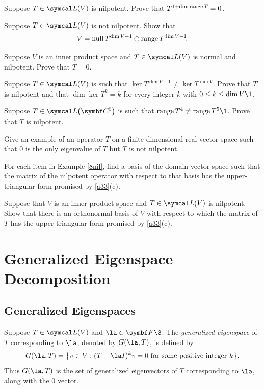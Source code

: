 \begin{exercises}
\exercise
Suppose $T \in \L(V)$ is nilpotent. Prove that $T^{1 + \dim \operatorname{range} T} = 0$.\label{nilrange}


\exercise
Suppose $T\in \L(V)$ is not nilpotent. Show that\label{8notnil}
\[
V = \operatorname{null} T^{\dim V-1} \oplus \operatorname{range} T^{\dim V-1}\!.
\]
\exercisedisplayend
{}


\exercise
Suppose $V$ is an inner product space and $T \in \L(V)$ is normal and nilpotent. Prove that $T = 0$.


\exercise
Suppose $T \in \L(V)$ is such that $\ker T^{\dim V - 1} \ne \ker T^{\dim V}\!$.  Prove that $T$ is nilpotent and that
$
\dim \ker T^k = k$
for every integer $k$ with $0 \le k \le \dim V\1$.\label{8nullTk}


\exercise
Suppose $T \in \L\paren[\big]{\C{5}}$ is such that $\ran T^4 \ne \ran T^5\1$.  Prove that $T$ is
nilpotent.


\exercise
Give an example of an operator $T$ on a finite-dimensional real vector space such that $0$ is the only eigenvalue of $T$ but $T$ is not nilpotent. \label{Nil1}


\exercise
For each item in Example \ref{8nil}, find a basis of the domain vector space such that the matrix of the nilpotent operator with respect to that basis has the upper-triangular form promised by \ref{a33}(c).


\exercise
Suppose that $V$ is an inner product space and $T \in \L(V)$ is nilpotent. Show that there is an orthonormal basis of $V$ with respect to which the matrix of $T$ has the upper-triangular form promised by \ref{a33}(c).


\end{exercises}

\section{Generalized Eigenspace Decomposition} \label{decompop}

\subsection{Generalized Eigenspaces}

{Suppose $T \in \L(V)$ and $\la \in \F{}\3$. The \emph{generalized eigenspace} of $T$ corresponding to $\la$, denoted by
$G(\la, T)$, is defined by
\[
G(\la, T) = \br[\big]{ v \in V : ( T- \la I)^k v = 0 \text{ for some positive integer } k}.
\]
Thus $G(\la, T)$ is the set of generalized eigenvectors of $T$ corresponding to $\la$, along with the $0$ vector.}

